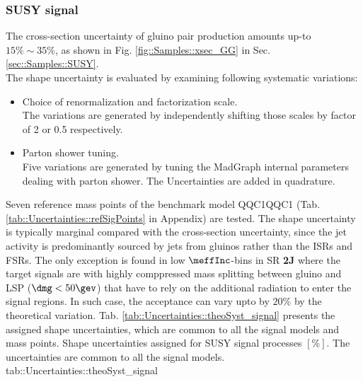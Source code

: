 


\clearpage
\subsubsection{SUSY signal} 
The cross-section uncertainty of gluino pair production amounts up-to $15\% \sim 35\%$, as shown in Fig. \ref{fig::Samples::xsec_GG} in Sec. \ref{sec::Samples::SUSY}.\\
The shape uncertainty is evaluated by examining following systematic variations:
\begin{itemize}
\item Choice of renormalization and factorization scale.\\
The variations are generated by independently shifting those scales by factor of 2 or 0.5 respectively. 

\item Parton shower tuning.\\
Five variations are generated by tuning the MadGraph internal parameters dealing with parton shower. The Uncertainties are added in quadrature.
\end{itemize}
Seven reference mass points of the benchmark model QQC1QQC1 (Tab. \ref{tab::Uncertainties::refSigPoints} in Appendix) are tested. 
The shape uncertainty is typically marginal compared with the cross-section uncertainty, since the jet activity is predominantly sourced by jets from gluinos rather than the ISRs and FSRs. 
The only exception is found in low $\meffInc$-bins in SR \textbf{2J} where the target signals are with highly comppressed mass splitting between gluino and LSP ($\dmg < 50\gev$) that have to rely on the additional radiation to enter the signal regions. In such case, the acceptance can vary upto by $20\%$ by the theoretical variation. Tab. \ref{tab::Uncertainties::theoSyst_signal} presents the assigned shape uncertainties, which are common to all the signal models and mass points.
{Shape uncertainties assigned for SUSY signal processes $[\%]$. The uncertainties are common to all the signal models.}
{tab::Uncertainties::theoSyst_signal}


